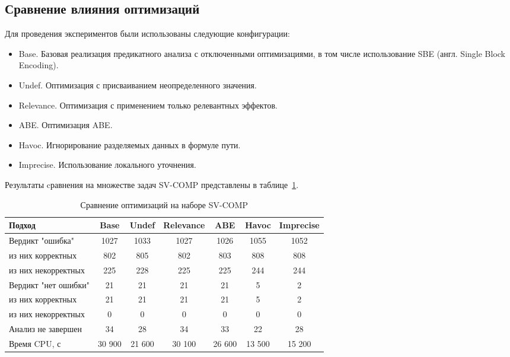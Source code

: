 \subsection{Сравнение влияния оптимизаций}

Для проведения экспериментов были использованы следующие конфигурации:

\begin{itemize}
\item Base. Базовая реализация предикатного анализа с отключенными оптимизациями, в том числе использование SBE (англ. Single Block Encoding).
\item Undef. Оптимизация с присваиванием неопределенного значения.
\item Relevance. Оптимизация с применением только релевантных эффектов.
\item ABE. Оптимизация ABE.
\item Havoc. Игнорирование разделяемых данных в формуле пути.
\item Imprecise. Использование локального уточнения.
\end{itemize}

Результаты cравнения на множестве задач SV-COMP представлены в таблице~\ref{table-sv-comp-opt}.

  \begin{table}[h]\footnotesize \centering
    \caption{Сравнение оптимизаций на наборе SV-COMP}
  	\label{table-sv-comp-opt}
    \begin{tabular}{ | l | c | c | c | c | c | c | }
      \hline
      Подход         				& Base 	& Undef 	& Relevance & ABE 	& Havoc 	&  Imprecise \\ \hline
      Вердикт "ошибка" 				& 1027  & 1033  	& 1027      & 1026  & 1055     	& 1052       \\ 
  \hspace{0.5cm} из них корректных 	& 802 	& 805 		& 802     	& 803   & 808    	& 808     	\\ 
  \hspace{0.5cm} из них некорректных & 225 	& 228 		& 225     	& 225  	& 244      	& 244       \\ \hline
      Вердикт "нет ошибки"  		& 21    & 21    	& 21    	& 21   	& 5     	& 2       \\ 
  \hspace{0.5cm} из них корректных 	& 21 	& 21    	& 21     	& 21   	& 5     	& 2       \\
  \hspace{0.5cm} из них некорректных & 0 	& 0    		& 0     	& 0   	& 0     	& 0       \\ \hline
      Анализ не завершен       		& 34     & 28     	& 34     	& 33   	& 22     	& 28      	\\ \hline
      Время CPU, с   				& 30 900 & 21 600 	& 30 100  	& 26 600 & 13 500   & 15 200     	\\ 
      \hline
    \end{tabular}
  \end{table}

